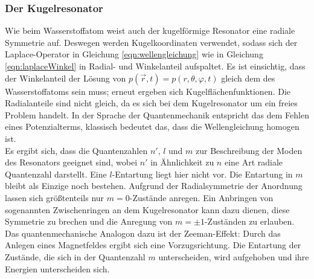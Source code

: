 \subsubsection{Der Kugelresonator}
\label{subsubsec:kugelresonator}
Wie beim Wasserstoffatom weist auch der kugelförmige Resonator eine radiale Symmetrie auf. Deswegen werden Kugelkoordinaten verwendet, sodass sich der Laplace-Operator in Gleichung \eqref{eqn:wellengleichung} wie in Gleichung \eqref{eqn:laplaceWinkel} in Radial- und Winkelanteil aufspaltet. Es ist einsichtig, dass der Winkelanteil der Lösung von $p(\vec{r}, t) = p(r,\theta,\varphi,t)$ gleich dem des Wasserstoffatoms sein muss; erneut ergeben sich Kugelflächenfunktionen. Die Radialanteile sind nicht gleich, da es sich bei dem Kugelresonator um ein freies Problem handelt. In der Sprache der Quantenmechanik entspricht das dem Fehlen eines Potenzialterms, klassisch bedeutet das, dass die Wellengleichung homogen ist.\\
Es ergibt sich, dass die Quantenzahlen $n'$, $l$ und $m$ zur Beschreibung der Moden des Resonators geeignet sind, wobei $n'$ in Ähnlichkeit zu $n$ eine Art radiale Quantenzahl darstellt. Eine $l$-Entartung liegt hier nicht vor. Die Entartung in $m$ bleibt als Einzige noch bestehen. %
Aufgrund der Radialsymmetrie der Anordnung lassen sich größtenteils nur $m=0$-Zustände anregen. Ein Anbringen von sogenannten Zwischenringen an dem Kugelresonator kann dazu dienen, diese Symmetrie zu brechen und die Anregung von $m=\pm1$-Zuständen zu erlauben. Das quantenmechanische Analogon dazu ist der Zeeman-Effekt: Durch das Anlegen eines Magnetfeldes ergibt sich eine Vorzugsrichtung. Die Entartung der Zustände, die sich in der Quantenzahl $m$ unterscheiden, wird aufgehoben und ihre Energien unterscheiden sich.
